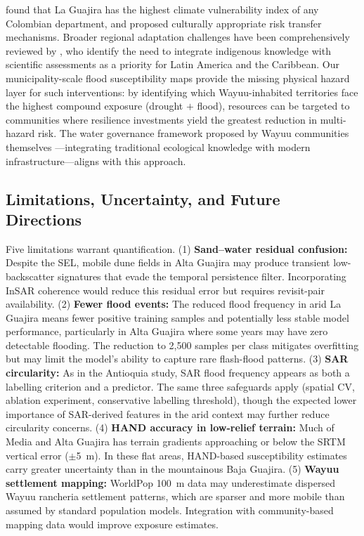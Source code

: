 \documentclass{article}
\begin{document}
\citet{FernandezLopera2024} found that La Guajira has the highest climate vulnerability index of any Colombian department, and proposed culturally appropriate risk transfer mechanisms. Broader regional adaptation challenges have been comprehensively reviewed by \citet{Cavazos2024}, who identify the need to integrate indigenous knowledge with scientific assessments as a priority for Latin America and the Caribbean. Our municipality-scale flood susceptibility maps provide the missing physical hazard layer for such interventions: by identifying which Wayuu-inhabited territories face the highest compound exposure (drought $+$ flood), resources can be targeted to communities where resilience investments yield the greatest reduction in multi-hazard risk. The water governance framework proposed by Wayuu communities themselves \citep{WayuuWaterGovernance2025}---integrating traditional ecological knowledge with modern infrastructure---aligns with this approach.

\subsection{Limitations, Uncertainty, and Future Directions}
\label{sec:limitations}

Five limitations warrant quantification. (1) \textbf{Sand--water residual confusion:} Despite the SEL, mobile dune fields in Alta Guajira may produce transient low-backscatter signatures that evade the temporal persistence filter. Incorporating InSAR coherence \citep{Garg2024} would reduce this residual error but requires revisit-pair availability. (2) \textbf{Fewer flood events:} The reduced flood frequency in arid La Guajira means fewer positive training samples and potentially less stable model performance, particularly in Alta Guajira where some years may have zero detectable flooding. The reduction to 2,500 samples per class mitigates overfitting but may limit the model's ability to capture rare flash-flood patterns. (3) \textbf{SAR circularity:} As in the Antioquia study, SAR flood frequency appears as both a labelling criterion and a predictor. The same three safeguards apply (spatial CV, ablation experiment, conservative labelling threshold), though the expected lower importance of SAR-derived features in the arid context may further reduce circularity concerns. (4) \textbf{HAND accuracy in low-relief terrain:} Much of Media and Alta Guajira has terrain gradients approaching or below the SRTM vertical error ($\pm$\SI{5}{\metre}). In these flat areas, HAND-based susceptibility estimates carry greater uncertainty than in the mountainous Baja Guajira. (5) \textbf{Wayuu settlement mapping:} WorldPop \SI{100}{\metre} data may underestimate dispersed Wayuu rancheria settlement patterns, which are sparser and more mobile than assumed by standard population models. Integration with community-based mapping data \citep{Contreras2019wayuu} would improve exposure estimates.
\end{document}
